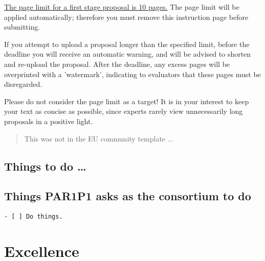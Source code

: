 \documentclass[noworkareas,deliverables,\classoptions]{euproposal}       %
\begin{document}
\begin{proposal}
\uline{The page limit for a first stage proposal is 10 pages.}
The page limit will be applied automatically; therefore you must remove this instruction page before submitting.

If you attempt to upload a proposal longer than the specified limit, before the deadline you will receive an automatic warning, and will be advised to shorten and re-upload the proposal. After the deadline, any excess pages will be overprinted with a 'watermark', indicating to evaluators that these pages must be disregarded.

Please do not consider the page limit as a target! It is in your interest to keep your text as concise as possible, since experts rarely view unnecessarily long proposals in a positive light.

\clearpage

\begin{abstract}
This was not in the EU community template ...
\end{abstract}


\ifsubmit\else\setcounter{tocdepth}{4}\fi
\tableofcontents
\clearpage


\begin{draft}
\section*{Things to do \dots}
\subsection*{Things PAR1P1 asks as the consortium to do}
\begin{verbatim}
- [ ] Do things.
\end{verbatim}
\end{draft}



\section{Excellence}




\end{proposal}
\end{document}
